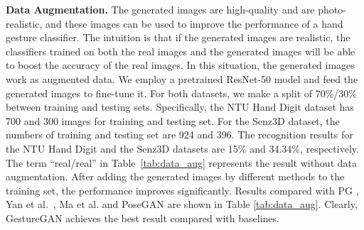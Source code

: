 \documentclass[sigconf]{acmart}
\begin{document}
\noindent \textbf{Data Augmentation.}
The generated images are high-quality and are photo-realistic, and  these images can be used to improve the performance of a hand gesture classifier.
The intuition is that if the generated images are realistic, the classifiers trained on both the real images and the generated images will be able to boost the accuracy of the real images.
In this situation, the generated images work as augmented data.
We employ a pretrained ResNet-50 model \cite{he2016deep} and feed the generated images to fine-tune it. 
For both datasets, we make a split of 70\%/30\% between training and testing sets.
Specifically, the NTU Hand Digit dataset has 700 and 300 images for training and testing set.
For the Senz3D dataset, the numbers of training and testing set are 924 and 396. 
The recognition results for the NTU Hand Digit and the Senz3D datasets are 15\% and 34.34\%, respectively.
The term ``real/real'' in Table~\ref{tab:data_aug} represents the result without data augmentation.
After adding the generated images by different methods to the training set, the performance improves significantly.
Results compared with PG \cite{ma2017pose}, Yan et al.~\cite{yan2017skeleton}, Ma et al. \cite{ma2017disentangled} and PoseGAN \cite{siarohin2017deformable}  are shown in Table \ref{tab:data_aug}.
Clearly, GestureGAN achieves the best result compared with baselines.


\begin{table}[!t]
	\centering
	\caption{Comparison of hand gesture recognition accuracy~(\%) on the NTU Hand Digit and Senz3D datasets.} 
	\label{tab:data_aug}
	\vspace{-0.15cm}
\end{table}
\end{document}

